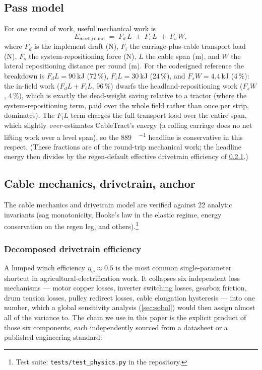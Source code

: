\documentclass[11pt,a4paper]{article}
\begin{document}
\subsection{Pass model}\label{sec:pass-model}

For one round of work, useful mechanical work is
\begin{equation}\label{eq:pass}
E_{\text{mech,round}} \;=\; F_d\,L \;+\; F_i\,L \;+\; F_s\,W,
\end{equation}
where $F_d$ is the implement draft (N), $F_i$ the carriage-plus-cable transport load (N), $F_s$ the system-repositioning force (N), $L$ the cable span (m), and $W$ the lateral repositioning distance per round (m). For the codesigned reference the breakdown is $F_d L = \SI{90}{\kilo\joule}$ (72\,\%), $F_i L = \SI{30}{\kilo\joule}$ (24\,\%), and $F_s W = \SI{4.4}{\kilo\joule}$ (4\,\%): the in-field work ($F_d L + F_i L$, 96\,\%) dwarfs the headland-repositioning work ($F_s W$, 4\,\%), which is exactly the dead-weight saving relative to a tractor (where the system-repositioning term, paid over the whole field rather than once per strip, dominates). The $F_i L$ term charges the full transport load over the entire span, which slightly \emph{over}-estimates CableTract's energy (a rolling carriage does no net lifting work over a level span), so the \SI{889}{\Wh\per\decare} headline is conservative in this respect. (These fractions are of the round-trip mechanical work; the headline energy then divides by the regen-default effective drivetrain efficiency of \cref{sec:drivetrain}.)

\subsection{Cable mechanics, drivetrain, anchor}\label{sec:physics}

The cable mechanics and drivetrain model are verified against 22 analytic invariants (sag monotonicity, Hooke's law in the elastic regime, energy conservation on the regen leg, and others).\footnote{Test suite: \texttt{tests/test\_physics.py} in the repository.}

\subsubsection{Decomposed drivetrain efficiency}\label{sec:drivetrain}

A lumped winch efficiency $\eta_w \approx 0.5$ is the most common single-parameter shortcut in agricultural-electrification work. It collapses six independent loss mechanisms --- motor copper losses, inverter switching losses, gearbox friction, drum tension losses, pulley redirect losses, cable elongation hysteresis --- into one number, which a global sensitivity analysis (\cref{sec:sobol}) would then assign almost all of the variance to. The chain we use in this paper is the explicit product of those six components, each independently sourced from a datasheet or a published engineering standard:
\end{document}
